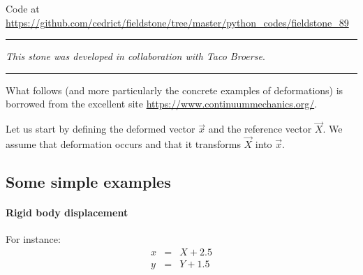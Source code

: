 

\begin{center}
Code at \url{https://github.com/cedrict/fieldstone/tree/master/python_codes/fieldstone_89}
\end{center}

\par\noindent\rule{\textwidth}{0.4pt}

{\sl This stone was developed in collaboration with Taco Broerse}. 

\par\noindent\rule{\textwidth}{0.4pt}


What follows (and more particularly the concrete examples of deformations) 
is borrowed from the excellent site \url{https://www.continuummechanics.org/}.

Let us start by defining the deformed vector $\vec{x}$ and the reference vector $\vec{X}$.
We assume that deformation occurs and that it transforms $\vec{X}$ into $\vec{x}$.

\subsection*{Some simple examples}

\paragraph{Rigid body displacement} For instance:  
\begin{eqnarray}
x &=& X + 2.5 \\
y &=& Y + 1.5 
\end{eqnarray}

\begin{center}
\end{center}

